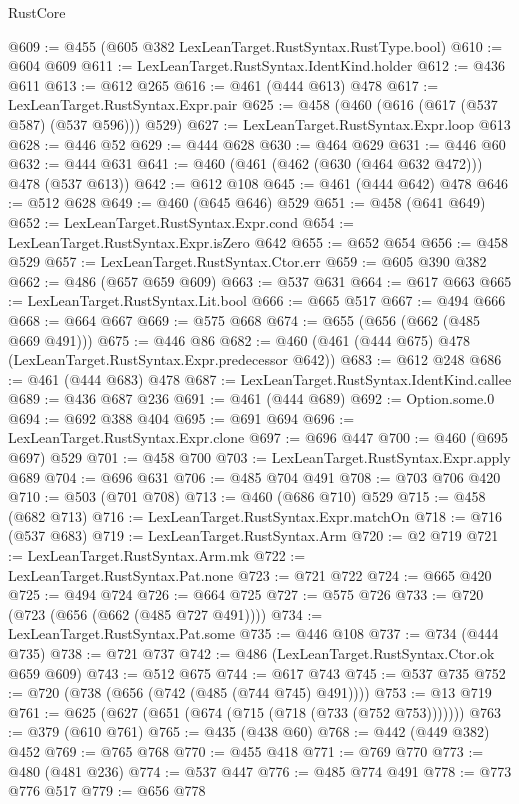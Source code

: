 \begin{lexlean}{RustCore}
\begin{coremodule}
@609 := @455 (@605 @382 LexLeanTarget.RustSyntax.RustType.bool)
@610 := @604 @609
@611 := LexLeanTarget.RustSyntax.IdentKind.holder
@612 := @436 @611
@613 := @612 @265
@616 := @461 (@444 @613) @478
@617 := LexLeanTarget.RustSyntax.Expr.pair
@625 := @458 (@460 (@616 (@617 (@537 @587) (@537 @596))) @529)
@627 := LexLeanTarget.RustSyntax.Expr.loop @613
@628 := @446 @52
@629 := @444 @628
@630 := @464 @629
@631 := @446 @60
@632 := @444 @631
@641 := @460 (@461 (@462 (@630 (@464 @632 @472))) @478 (@537 @613))
@642 := @612 @108
@645 := @461 (@444 @642) @478
@646 := @512 @628
@649 := @460 (@645 @646) @529
@651 := @458 (@641 @649)
@652 := LexLeanTarget.RustSyntax.Expr.cond
@654 := LexLeanTarget.RustSyntax.Expr.isZero @642
@655 := @652 @654
@656 := @458 @529
@657 := LexLeanTarget.RustSyntax.Ctor.err
@659 := @605 @390 @382
@662 := @486 (@657 @659 @609)
@663 := @537 @631
@664 := @617 @663
@665 := LexLeanTarget.RustSyntax.Lit.bool
@666 := @665 @517
@667 := @494 @666
@668 := @664 @667
@669 := @575 @668
@674 := @655 (@656 (@662 (@485 @669 @491)))
@675 := @446 @86
@682 := @460 (@461 (@444 @675) @478 (LexLeanTarget.RustSyntax.Expr.predecessor @642))
@683 := @612 @248
@686 := @461 (@444 @683) @478
@687 := LexLeanTarget.RustSyntax.IdentKind.callee
@689 := @436 @687 @236
@691 := @461 (@444 @689)
@692 := Option.some.{0}
@694 := @692 @388 @404
@695 := @691 @694
@696 := LexLeanTarget.RustSyntax.Expr.clone
@697 := @696 @447
@700 := @460 (@695 @697) @529
@701 := @458 @700
@703 := LexLeanTarget.RustSyntax.Expr.apply @689
@704 := @696 @631
@706 := @485 @704 @491
@708 := @703 @706 @420
@710 := @503 (@701 @708)
@713 := @460 (@686 @710) @529
@715 := @458 (@682 @713)
@716 := LexLeanTarget.RustSyntax.Expr.matchOn
@718 := @716 (@537 @683)
@719 := LexLeanTarget.RustSyntax.Arm
@720 := @2 @719
@721 := LexLeanTarget.RustSyntax.Arm.mk
@722 := LexLeanTarget.RustSyntax.Pat.none
@723 := @721 @722
@724 := @665 @420
@725 := @494 @724
@726 := @664 @725
@727 := @575 @726
@733 := @720 (@723 (@656 (@662 (@485 @727 @491))))
@734 := LexLeanTarget.RustSyntax.Pat.some
@735 := @446 @108
@737 := @734 (@444 @735)
@738 := @721 @737
@742 := @486 (LexLeanTarget.RustSyntax.Ctor.ok @659 @609)
@743 := @512 @675
@744 := @617 @743
@745 := @537 @735
@752 := @720 (@738 (@656 (@742 (@485 (@744 @745) @491))))
@753 := @13 @719
@761 := @625 (@627 (@651 (@674 (@715 (@718 (@733 (@752 @753)))))))
@763 := @379 (@610 @761)
@765 := @435 (@438 @60)
@768 := @442 (@449 @382) @452
@769 := @765 @768
@770 := @455 @418
@771 := @769 @770
@773 := @480 (@481 @236)
@774 := @537 @447
@776 := @485 @774 @491
@778 := @773 @776 @517
@779 := @656 @778

\end{coremodule}
\end{lexlean}
